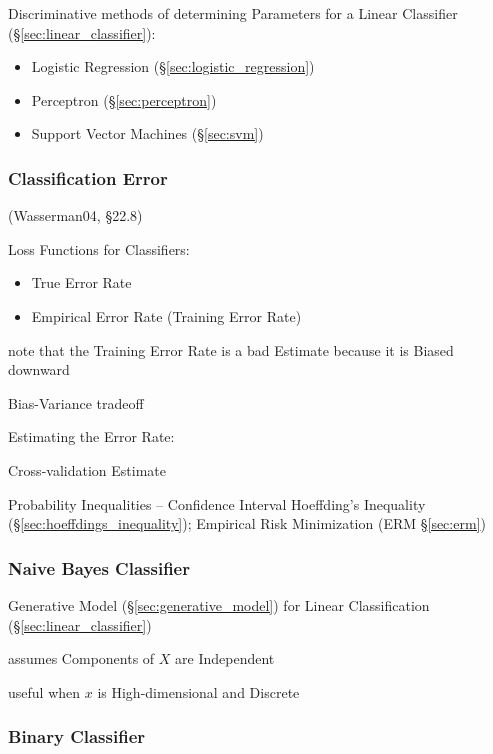 Discriminative methods of determining Parameters for a Linear Classifier
(\S\ref{sec:linear_classifier}):
\begin{itemize}
  \item Logistic Regression (\S\ref{sec:logistic_regression})
  \item Perceptron (\S\ref{sec:perceptron})
  \item Support Vector Machines (\S\ref{sec:svm})
\end{itemize}



\subsubsection{Classification Error}\label{sec:classification_error}

(Wasserman04, \S22.8)

Loss Functions for Classifiers:
\begin{itemize}
  \item True Error Rate
  \item Empirical Error Rate (Training Error Rate)
\end{itemize}

note that the Training Error Rate is a bad Estimate because it is Biased
downward

Bias-Variance tradeoff

Estimating the Error Rate:

Cross-validation Estimate

Probability Inequalities -- Confidence Interval \fist Hoeffding's Inequality
(\S\ref{sec:hoeffdings_inequality}); Empirical Risk Minimization (ERM
\S\ref{sec:erm})



\subsubsection{Naive Bayes Classifier}\label{sec:naive_bayes}

Generative Model (\S\ref{sec:generative_model}) for Linear Classification
(\S\ref{sec:linear_classifier})

assumes Components of $X$ are Independent

useful when $x$ is High-dimensional and Discrete



\subsubsection{Binary Classifier}\label{sec:binary_classifier}

